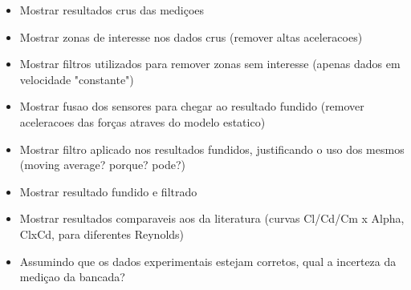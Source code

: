 \begin{itemize}
    \item Mostrar resultados crus das mediçoes
    \item Mostrar zonas de interesse nos dados crus (remover altas aceleracoes)
    \item Mostrar filtros utilizados para remover zonas sem interesse (apenas dados em velocidade "constante")
    \item Mostrar fusao dos sensores para chegar ao resultado fundido (remover aceleracoes das forças atraves do modelo estatico)
    \item Mostrar filtro aplicado nos resultados fundidos, justificando o uso dos mesmos (moving average? porque? pode?)
    \item Mostrar resultado fundido e filtrado
    \item Mostrar resultados comparaveis aos da literatura (curvas Cl/Cd/Cm x Alpha, ClxCd, para diferentes Reynolds)
    \item Assumindo que os dados experimentais estejam corretos, qual a incerteza da mediçao da bancada?
\end{itemize}

